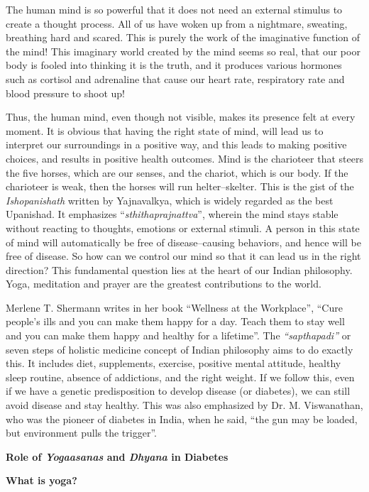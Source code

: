 The human mind is so powerful that it does not need an external stimulus to create a thought process. All of us have woken up from a nightmare, sweating, breathing hard and scared. This is purely the work of the imaginative function of the mind! This imaginary world created by the mind seems so real, that our poor body is fooled into thinking it is the truth, and it produces various hormones such as cortisol and adrenaline that cause our heart rate, respiratory rate and blood pressure to shoot up!

Thus, the human mind, even though not visible, makes its presence felt at every moment. It is obvious that having the right state of mind, will lead us to interpret our surroundings in a positive way, and this leads to making positive choices, and results in positive health outcomes. Mind is the charioteer that steers the five horses, which are our senses, and the chariot, which is our body. If the charioteer is weak, then the horses will run helter–skelter. This is the gist of the \textit{Ishopanishath} written by Yajnavalkya, which is widely regarded as the best Upanishad. It emphasizes “\textit{sthithaprajnattva}”, wherein the mind stays stable without reacting to thoughts, emotions or external stimuli. A person in this state of mind will automatically be free of disease–causing behaviors, and hence will be free of disease. So how can we control our mind so that it can lead us in the right direction? This fundamental question lies at the heart of our Indian philosophy. Yoga, meditation and prayer are the greatest contributions to the world.

Merlene T. Shermann writes in her book “Wellness at the Workplace”, “Cure people’s ills and you can make them happy for a day. Teach them to stay well and you can make them happy and healthy for a lifetime”. The \textit{“sapthapadi”} or seven steps of holistic medicine concept of Indian philosophy aims to do exactly this. It includes diet, supplements, exercise, positive mental attitude, healthy sleep routine, absence of addictions, and the right weight. If we follow this, even if we have a genetic predisposition to develop disease (or diabetes), we can still avoid disease and stay healthy. This was also emphasized by Dr. M. Viswanathan, who was the pioneer of diabetes in India, when he said, “the gun may be loaded, but environment pulls the trigger”.

\textbf{Role of \textit{Yogaasanas} and \textit{Dhyana} in Diabetes}

\textbf{What is yoga?}


